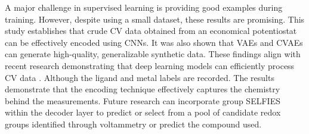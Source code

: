 A major challenge in supervised learning is providing good examples during training. However, despite using a small dataset, these results are promising. This study establishes that crude CV data obtained from an economical potentiostat can be effectively encoded using CNNs. It was also shown that VAEs and CVAEs can generate high-quality, generalizable synthetic data. These findings align with recent research demonstrating that deep learning models can efficiently process CV data \cite{Hoar2022}. Although the ligand and metal labels are recorded. The results demonstrate that the encoding technique effectively captures the chemistry behind the measurements. Future research can incorporate group SELFIES \cite{D3DD00012E} within the decoder layer to predict or select from a pool of candidate redox groups identified through voltammetry or predict the compound used. 
